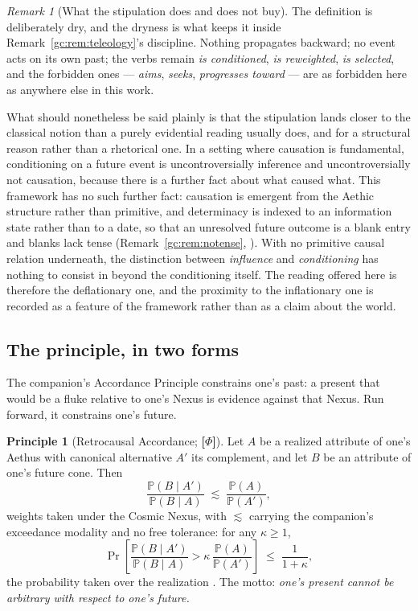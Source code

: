 \documentclass[11pt]{article}
\numberwithin{equation}{section}
\theoremstyle{plain}
\theoremstyle{definition}
\newtheorem{principle}{Principle}
\theoremstyle{remark}
\newtheorem{remark}[theorem]{Remark}
\newcommand{\PP}{\mathbb{P}}
\begin{document}
\begin{remark}[What the stipulation does and does not buy]
\label{gc:rem:retrocaution}
The definition is deliberately dry, and the dryness is what keeps it
inside Remark~\ref{gc:rem:teleology}'s discipline. Nothing propagates
backward; no event acts on its own past; the verbs remain \emph{is
conditioned}, \emph{is reweighted}, \emph{is selected}, and the
forbidden ones --- \emph{aims}, \emph{seeks}, \emph{progresses toward}
--- are as forbidden here as anywhere else in this work.

What should nonetheless be said plainly is that the stipulation lands
closer to the classical notion than a purely evidential reading usually
does, and for a structural reason rather than a rhetorical one. In a
setting where causation is fundamental, conditioning on a future event
is uncontroversially inference and uncontroversially not causation,
because there is a further fact about what caused what. This framework
has no such further fact: causation is emergent from the Aethic
structure rather than primitive, and determinacy is indexed to an
information state rather than to a date, so that an unresolved future
outcome is a blank entry and blanks lack tense
(Remark~\ref{gc:rem:notense}, \cite{AethusDecision}). With no primitive
causal relation underneath, the distinction between \emph{influence} and
\emph{conditioning} has nothing to consist in beyond the conditioning
itself. The reading offered here is therefore the deflationary one, and
the proximity to the inflationary one is recorded as a feature of the
framework rather than as a claim about the world.
\end{remark}



\subsection{The principle, in two forms}\label{gc:sub:retroaccord}

The companion's
Accordance Principle constrains one's past: a present that would be a
fluke relative to one's Nexus is evidence against that Nexus. Run
forward, it constrains one's future.

\begin{principle}[Retrocausal Accordance; \textbf{[$\Phi$]}]
\label{gc:prin:retroaccord}
Let $A$ be a realized attribute of one's Aethus with canonical
alternative $A'$ its complement, and let $B$ be an attribute of one's
future cone. Then
\begin{equation}\label{gc:eq:retroaccord}
\frac{\PP(B\mid A')}{\PP(B\mid A)}\;\lesssim\;\frac{\PP(A)}{\PP(A')},
\end{equation}
weights taken under the Cosmic Nexus, with $\lesssim$ carrying the
companion's exceedance modality and no free tolerance: for any
$\kappa\ge1$,
\begin{equation}\label{gc:eq:retroexceed}
\Pr\left[\frac{\PP(B\mid A')}{\PP(B\mid A)}
>\kappa\,\frac{\PP(A)}{\PP(A')}\right]\;\le\;\frac{1}{1+\kappa},
\end{equation}
the probability taken over the realization \cite{NexicFoundation}. The
motto: \emph{one's present cannot be arbitrary with respect to one's
future.}
\end{principle}
\end{document}
